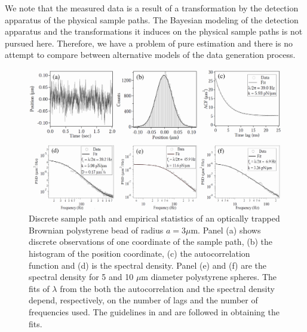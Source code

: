\documentclass[fleqn,10pt]{wlscirep}
\begin{document}
We note that the measured data is a result of a transformation by
the detection apparatus of the physical sample paths. The Bayesian
modeling of the detection apparatus and the transformations it induces
on the physical sample paths is not pursued here. Therefore, we have
a problem of pure estimation and there is no attempt to compare between
alternative models of the data generation process.
\begin{figure}[t]
\includegraphics[scale=0.66]{figure2}

\caption{Discrete sample path and empirical statistics of an optically trapped
Brownian polystyrene bead of radius $a=3\mu$m. Panel (a) shows discrete
observations of one coordinate of the sample path, (b) the histogram
of the position coordinate, (c) the autocorrelation function and (d)
is the spectral density. Panel (e) and (f) are the spectral density
for 5 and 10 $\mu$m diameter polystyrene spheres. The fits of $\lambda$
from the both the autocorrelation and the spectral density depend,
respectively, on the number of lags and the number of frequencies
used. The guidelines in \cite{berg2004power} and \cite{tassieri2012microrheology}
are followed in obtaining the fits. \label{fig:discrete-sample-path}}
\end{figure}
\end{document}
